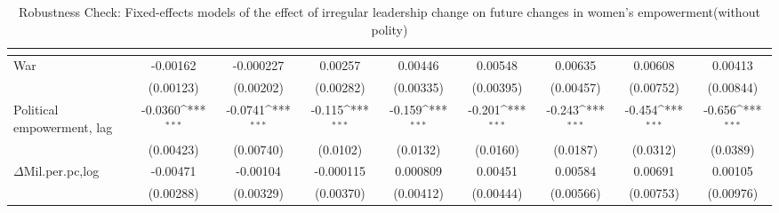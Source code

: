 \begin{table}[htbp]\centering
\def\sym#1{\ifmmode^{#1}\else\(^{#1}\)\fi}
\caption{Robustness Check: Fixed-effects models of the effect of irregular leadership change on future changes in women's empowerment(without polity) \label{fepolempnopolity}}
\begin{tabular}{l*{8}{c}}
\hline\hline
                    &&&&&&&&\\
\hline
War           &    -0.00162         &   -0.000227         &     0.00257         &     0.00446         &     0.00548         &     0.00635         &     0.00608         &     0.00413         \\
                    &   (0.00123)         &   (0.00202)         &   (0.00282)         &   (0.00335)         &   (0.00395)         &   (0.00457)         &   (0.00752)         &   (0.00844)         \\
[1em]
Political empowerment, lag   &     -0.0360\sym{***}&     -0.0741\sym{***}&      -0.115\sym{***}&      -0.159\sym{***}&      -0.201\sym{***}&      -0.243\sym{***}&      -0.454\sym{***}&      -0.656\sym{***}\\
                    &   (0.00423)         &   (0.00740)         &    (0.0102)         &    (0.0132)         &    (0.0160)         &    (0.0187)         &    (0.0312)         &    (0.0389)         \\
[1em]
$\Delta$Mil.per.pc,log         &    -0.00471         &    -0.00104         &   -0.000115         &    0.000809         &     0.00451         &     0.00584         &     0.00691         &     0.00105         \\
                    &   (0.00288)         &   (0.00329)         &   (0.00370)         &   (0.00412)         &   (0.00444)         &   (0.00566)         &   (0.00753)         &   (0.00976)         \\

\end{tabular}
\end{table}
